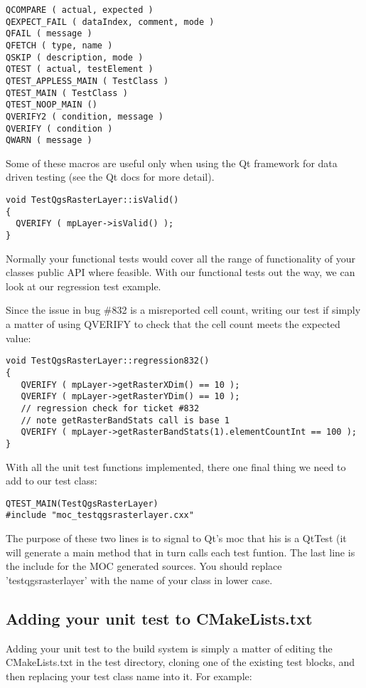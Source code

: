 \begin{verbatim}
QCOMPARE ( actual, expected )
QEXPECT_FAIL ( dataIndex, comment, mode )
QFAIL ( message )
QFETCH ( type, name )
QSKIP ( description, mode )
QTEST ( actual, testElement )
QTEST_APPLESS_MAIN ( TestClass )
QTEST_MAIN ( TestClass )
QTEST_NOOP_MAIN ()
QVERIFY2 ( condition, message )
QVERIFY ( condition )
QWARN ( message ) 
\end{verbatim}

Some of these macros are useful only when using the Qt framework for data
driven testing (see the Qt docs for more detail).

\begin{verbatim}
void TestQgsRasterLayer::isValid()
{
  QVERIFY ( mpLayer->isValid() );
}
\end{verbatim}

Normally your functional tests would cover all the range of functionality of
your classes public API where feasible. With our functional tests out the way,
we can look at our regression test example.

Since the issue in bug \#832 is a misreported cell count, writing our test if
simply a matter of using QVERIFY to check that the cell count meets the
expected value:

\begin{verbatim}
void TestQgsRasterLayer::regression832()
{
   QVERIFY ( mpLayer->getRasterXDim() == 10 );
   QVERIFY ( mpLayer->getRasterYDim() == 10 );
   // regression check for ticket #832
   // note getRasterBandStats call is base 1
   QVERIFY ( mpLayer->getRasterBandStats(1).elementCountInt == 100 );
}
\end{verbatim}

With all the unit test functions implemented, there one final thing we need to
add to our test class:

\begin{verbatim}
QTEST_MAIN(TestQgsRasterLayer)
#include "moc_testqgsrasterlayer.cxx"
\end{verbatim}

The purpose of these two lines is to signal to Qt's moc that his is a QtTest
(it will generate a main method that in turn calls each test funtion.  The last
line is the include for the MOC generated sources. You should replace
'testqgsrasterlayer' with the name of your class in lower case.

\hypertarget{toc50}{}
\subsection{Adding your unit test to CMakeLists.txt}
Adding your unit test to the build system is simply a matter of editing the
CMakeLists.txt in the test directory, cloning one of the existing test blocks,
and then replacing your test class name into it.  For example:

